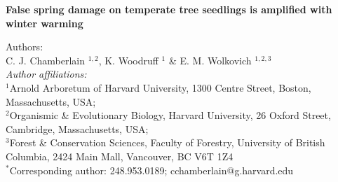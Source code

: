 \documentclass{article}\usepackage[]{graphicx}\usepackage[]{color}
\begin{document}
\noindent \textbf{\Large{False spring damage on temperate tree seedlings is amplified with winter warming}}

\noindent Authors:\\
C. J. Chamberlain $^{1,2}$, K. Woodruff $^{1}$ \& E. M. Wolkovich $^{1,2,3}$
\vspace{2ex}\\
\emph{Author affiliations:}\\
$^{1}$Arnold Arboretum of Harvard University, 1300 Centre Street, Boston, Massachusetts, USA; \\
$^{2}$Organismic \& Evolutionary Biology, Harvard University, 26 Oxford Street, Cambridge, Massachusetts, USA; \\
$^{3}$Forest \& Conservation Sciences, Faculty of Forestry, University of British Columbia, 2424 Main Mall, Vancouver, BC V6T 1Z4\\
\vspace{2ex}
$^*$Corresponding author: 248.953.0189; cchamberlain@g.harvard.edu\\

\renewcommand{\thetable}{\arabic{table}}
\renewcommand{\thefigure}{\arabic{figure}}
\renewcommand{\labelitemi}{$-$}

\end{document}
